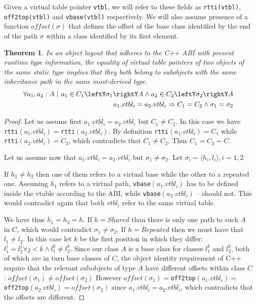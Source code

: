\documentclass[preprint]{sigplanconf}
\makeatletter
\DeclareRobustCommand{\code}[1]{{\lstinline[breaklines=false,escapechar=@]{#1}}}
\newtheorem{theorem}{Theorem}
\makeatother
\begin{document}
\noindent
Given a virtual table pointer \code{vtbl}, we will refer to these fields as 
\code{rtti(vtbl)}, \code{off2top(vtbl)} and \code{vbase(vtbl)} respectively. 
We will also assume presence of a function $\mathit{offset}(\sigma)$ that defines the 
offset of the base class identified by the end of the path $\sigma$ within a 
class identified by its first element.

\begin{theorem}
In an object layout that adheres to the C++ ABI with present runtime type 
information, the equality of virtual table pointers of two objects of the same 
static type implies that they both belong to subobjects with the same 
inheritance path in the same most-derived type.
\begin{eqnarray*}
    \forall a_1, a_2 : A\ |\ a_1\in C_1\leftY\sigma_1\rightY A \wedge a_2\in C_2\leftY\sigma_2\rightY A \\
    a_1.vtbl_i = a_2.vtbl_i \Rightarrow C_1 = C_2 \wedge \sigma_1 = \sigma_2
\end{eqnarray*}
\label{thm:vtbl}
\end{theorem}
\begin{proof}
Let us assume first $a_1.vtbl_i = a_2.vtbl_i$ but $C_1 \neq C_2$. In this case we 
have \code{rtti}$(a_1.vtbl_i) = $\code{rtti}$(a_2.vtbl_i)$. By definition 
\code{rtti}$(a_1.vtbl_i) = C_1$ while \code{rtti}$(a_2.vtbl_i) = C_2$, which 
contradicts that $C_1 \neq C_2$. Thus $C_1 = C_2 = C$.

Let us assume now that $a_1.vtbl_i = a_2.vtbl_i$ but $\sigma_1 \neq \sigma_2$. 
Let $\sigma_i=\langle h_i,l_i\rangle,i=1,2$ 

If $h_1 \neq h_2$ then one of them refers to a virtual base while the other to a 
repeated one. Assuming $h_1$ refers to a virtual path, \code{vbase}$(a_1.vtbl_i)$ 
has to be defined inside the vtable according to the ABI, while 
\code{vbase}$(a_2.vtbl_i)$ -- should not. This would contradict again that both 
$vtbl_i$ refer to the same virtual table.

We have thus $h_1 = h_2 = h$. If $h = Shared$ than there is only one path to 
such $A$ in $C$, which would contradict $\sigma_1 \neq \sigma_2$. 
If $h = Repeated$ then we must have that $l_1 \neq l_2$. In this case let $k$ be 
the first position in which they differ: 
$l_1^j=l_2^j \forall j<k \wedge l_1^k\neq l_2^k$. Since our class $A$ is a base 
class for classes $l_1^k$ and $l_2^k$, both of which are in turn base classes of 
$C$, the object identity requirement of C++ require that the relevant subobjects 
of type $A$ have different offsets within class $C$: 
$\mathit{offset}(\sigma_1)\neq \mathit{offset}(\sigma_2)$ However 
$\mathit{offset}(\sigma_1)=$\code{off2top}$(a_1.vtbl_i)=$\code{off2top}$(a_2.vtbl_i)=\mathit{offset}(\sigma_2)$ 
since $a_1.vtbl_i = a_2.vtbl_i$, which contradicts that the offsets are different.
\end{proof}
\end{document}
